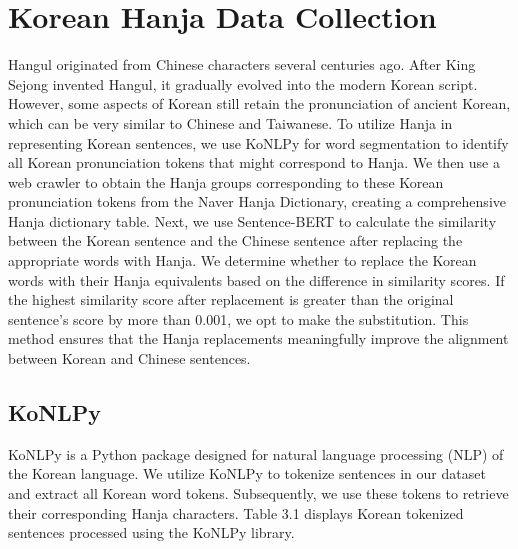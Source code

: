 \documentclass[PhD]{PHlab-thesis}
\begin{document}
\section{Korean Hanja Data Collection}
Hangul originated from Chinese characters several centuries ago. After King Sejong invented Hangul, it gradually evolved into the modern Korean script. However, some aspects of Korean still retain the pronunciation of ancient Korean, which can be very similar to Chinese and Taiwanese. To utilize Hanja in representing Korean sentences, we use KoNLPy for word segmentation to identify all Korean pronunciation tokens that might correspond to Hanja. We then use a web crawler to obtain the Hanja groups corresponding to these Korean pronunciation tokens from the Naver Hanja Dictionary, creating a comprehensive Hanja  dictionary table.
Next, we use Sentence-BERT to calculate the similarity between the Korean sentence and the Chinese sentence after replacing the appropriate words with Hanja. We determine whether to replace the Korean words with their Hanja equivalents based on the difference in similarity scores. If the highest similarity score after replacement is greater than the original sentence's score by more than 0.001, we opt to make the substitution. This method ensures that the Hanja replacements meaningfully improve the alignment between Korean and Chinese sentences.

\subsection{KoNLPy}
KoNLPy\cite{park2014konlpy} is a Python package designed for natural language processing (NLP) of the Korean language. We utilize KoNLPy to tokenize sentences in our dataset and extract all Korean word tokens. Subsequently, we use these tokens to retrieve their corresponding Hanja characters.
Table 3.1 displays Korean tokenized sentences processed using the KoNLPy library.

\end{document}
